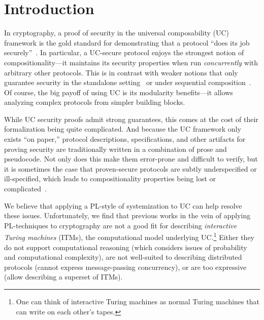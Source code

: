 \section{Introduction}
\label{sec:introduction}

In cryptography, a proof of security in the universal composability (UC)
framework is the gold standard for demonstrating that a protocol ``does its job
securely''~\cite{canetti2001universally}. In particular, a UC-secure protocol
enjoys the strongest notion of compositionality---it maintains its security
properties when run \emph{concurrently} with arbitrary other protocols. This is
in contrast with weaker notions that only guarantee security in the standalone
setting~\cite{lindell2014introduction} or under sequential
composition~\cite{goldreich1987play}. Of course, the big payoff of using UC is
its modularity benefits---it allows analyzing complex protocols from simpler
building blocks.

\begin{comment}
In a nutshell, security proofs in UC follow the real/ideal
paradigm~\cite{goldreich1987play}. The security requirements of a given task are
defined as a program for a \emph{single trusted process} called an \emph{ideal
  functionality}, which runs in an imagined ideal world. This serves as a
specification of the desired security properties for a distributed protocol
achieving the task across \emph{many unstrusted processes}, which runs in the
real world. Roughly speaking, we say that a protocol $\pi$ \emph{emulates} an
ideal functionality $\mc{F}$ (i.e., it meets its specification) if every
adversarial behavior in the real world can also be exhibited in the ideal world.
\end{comment}

 While UC security proofs admit strong
guarantees, this comes at the cost of their formalization being quite
complicated. And because the UC framework only exists ``on paper,'' protocol
descriptions, specifications, and other artifacts for proving security are
traditionally written in a combination of prose and pseudocode. Not only does
this make them error-prone and difficult to verify, but it is sometimes the case
that proven-secure protocols are subtly underspecified or ill-specified, which
leads to compositionality properties being lost or
complicated~\cite{camenisch2016universal}.

We believe that applying a PL-style of systemization to UC can help resolve
these issues. Unfortunately, we find that previous works in the vein of applying
PL-techniques to cryptography are not a good fit for describing
\emph{interactive Turing machines} (ITMs), the computational model underlying
UC.\footnote{One can think of interactive Turing machines as normal Turing
  machines that can write on each other's tapes.} Either they do not support
computational reasoning (which considers issues of probability and computational
complexity), are not well-suited to describing distributed protocols (cannot
express message-passing concurrency), or are too expressive (allow describing a
superset of ITMs).

